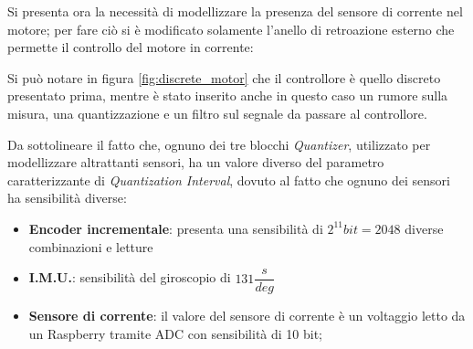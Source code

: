 Si presenta ora la necessità di modellizzare la presenza del sensore di corrente nel motore; per fare ciò si è modificato solamente l'anello di retroazione esterno che permette il controllo del motore in corrente:

Si può notare in figura \ref{fig:discrete_motor} che il controllore è quello discreto presentato prima, mentre è stato inserito anche in questo caso un rumore sulla misura, una quantizzazione e un filtro sul segnale da passare al controllore.


Da sottolineare il fatto che, ognuno dei tre blocchi \textit{Quantizer}, utilizzato per modellizzare altrattanti sensori, ha un valore diverso del parametro caratterizzante di \textit{Quantization Interval}, dovuto al fatto che ognuno dei sensori ha sensibilità diverse:
\begin{itemize}
	\item \textbf{Encoder incrementale}: presenta una sensibilità di $2^{11} bit = 2048$ diverse combinazioni e letture
	\item \textbf{I.M.U.}: sensibilità del giroscopio di $131\dfrac{s}{deg}$
	\item \textbf{Sensore di corrente}: il valore del sensore di corrente è un voltaggio letto da un Raspberry tramite ADC con sensibilità di 10 bit;
\end{itemize}